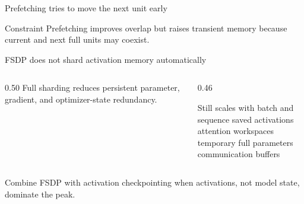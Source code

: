 \documentclass[handout]{beamer}
\begin{document}
\begin{frame}{Prefetching tries to move the next unit early}
  \begin{center}
  \end{center}
  \begin{alertblock}{Constraint}
    Prefetching improves overlap but raises transient memory because current and next full units may coexist.
  \end{alertblock}
\end{frame}

\begin{frame}{FSDP does not shard activation memory automatically}
  \begin{columns}[c]
    \begin{column}{0.50\linewidth}
      Full sharding reduces persistent parameter, gradient, and optimizer-state redundancy.
    \end{column}
    \begin{column}{0.46\linewidth}
      \begin{alertblock}{Still scales with batch and sequence}
        saved activations\\attention workspaces\\temporary full parameters\\communication buffers
      \end{alertblock}
    \end{column}
  \end{columns}
  \vfill
  Combine FSDP with activation checkpointing when activations, not model state, dominate the peak.
\end{frame}
\end{document}
